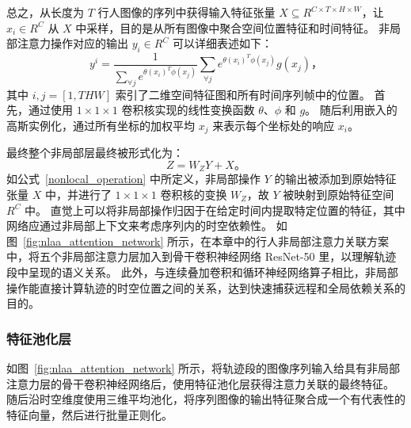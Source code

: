 总之，从长度为 $T$ 行人图像的序列中获得输入特征张量 $ X\subseteq R^{C\times T\times H\times W} $，让 $ x_i \in R^C $ 从 $X$ 中采样，目的是从所有图像中聚合空间位置特征和时间特征。  
非局部注意力操作对应的输出 $y_i\in R^C$ 可以详细表述如下：
\begin{equation}
y^i=\frac{1}{\sum_{\forall j} e^{\theta\left(x_i\right)^T \phi \left(x_j\right)}} \sum_{\forall j} e^{\theta\left(x_i\right)^T \phi \left(x_j\right)} g\left(x_j\right)\mbox{，}
\end{equation}
其中 $i,j=\left[1,THW\right]$ 索引了二维空间特征图和所有时间序列帧中的位置。 
首先，通过使用 $ 1 \times 1 \times 1 $ 卷积核实现的线性变换函数 $\theta$、$\phi$ 和 $g$。 
随后利用嵌入的高斯实例化，通过所有坐标的加权平均 $x_j$ 来表示每个坐标处的响应 $x_i$。

最终整个非局部层最终被形式化为：
\begin{equation}
Z=W_{Z}Y+X\mbox{。}
\end{equation}
如公式~\ref{nonlocal_operation} 中所定义，非局部操作 $Y$ 的输出被添加到原始特征张量 $X$ 中，并进行了 $1 \times 1 \times 1 $ 卷积核的变换 $W_Z$，故 $Y$ 被映射到原始特征空间 $R^{C}$ 中。
直觉上可以将非局部操作归因于在给定时间内提取特定位置的特征，其中网络应通过非局部上下文来考虑序列内的时空依赖性。
如图~\ref{fig:nlaa_attention_network} 所示，在本章中的行人非局部注意力关联方案中，将五个非局部注意力层加入到骨干卷积神经网络 ResNet-50 里，以理解轨迹段中呈现的语义关系。
此外，与连续叠加卷积和循环神经网络算子相比，非局部操作能直接计算轨迹的时空位置之间的关系，达到快速捕获远程和全局依赖关系的目的。


\subsubsection{特征池化层}
如图~\ref{fig:nlaa_attention_network} 所示，将轨迹段的图像序列输入给具有非局部注意力层的骨干卷积神经网络后，使用特征池化层获得注意力关联的最终特征。
随后沿时空维度使用三维平均池化，将序列图像的输出特征聚合成一个有代表性的特征向量，然后进行批量正则化。

